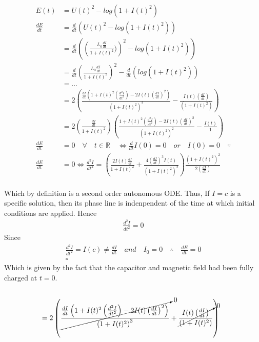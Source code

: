 \documentclass[a4paper]{article}
\begin{document}
\begin{equation*}
\begin{aligned}
\end{aligned}
\end{equation*}
\LARGE
\begin{align*}
E(t) & = U(t)^{2}-log(1+I(t)^{2})\\
\frac{dE}{dt} & = \frac{d}{dt}\left(U(t)^{2}-log(1+I(t)^{2})\right)\\
 & = \frac{d}{dt}\left(\left(\frac{L_{0}\frac{dI}{dt}}{1+I(t)^{2}})\right)^{2}-log\left(1+I(t)^{2}\right)\right) \\
& = \frac{d}{dt}\left(\frac{L_{0}\frac{dI}{dt}}{1+I(t)^{2}}\right)^{2}-\frac{d}{dt}\left(log\left(1+I(t)^{2}\right)\right)\\
& = ...\\
& = 2\left({\frac{\frac{dI}{dt}\left(1+I(t)^{2}\left(\frac{d^{2}I}{dt^{2}}\right)-2I(t)\left(\frac{dI}{dt}\right)^{2}\right)}{\left(1+I(t)^{2}\right)^{3}}} -   {\frac{I(t)\left(\frac{dI}{dt}\right)}{\left(1+I(t)^{2}\right)}}\right)\\
& = 2\left(\frac{\frac{dI}{dt}}{1+I(t)^{2}}\right)   \left({\frac{1+I(t)^{2}\left(\frac{d^{2}I}{dt^{2}}\right)-2I(t)\left(\frac{dI}{dt}\right)^{2}}{\left(1+I(t)^{2}\right)^{2}}} -   {\frac{I(t)}{1}}\right)\\
\frac{dE}{dt} & = 0 \quad \forall \quad t \in \mathbb{R} \quad \Longleftrightarrow \frac{d}{dt}I(0) = 0 \quad or \quad I(0)= 0 \quad \because \\
\frac{dE}{dt} &= 0 \Longleftrightarrow 
{\frac{d^{2}I}{dt^{2}}}=\left(\frac{2I(t)\frac{dI}{dt}}{1+I(t)^{2}}+\frac{4\left(\frac{dI}{dt}\right)^{3}I(t)}{\left(1+I(t)^{2}\right)^{3}}\right)\frac{\left(1+I(t)^{2}\right)^{2}}{2\left(\frac{dI}{dt}\right)}
\end{align*}\\
Which by definition is a second order autonomous ODE. Thus, If $I=c$ is a specific solution, then its phase line is indenpendent of the time at which initial conditions are applied. Hence
\begin{align*}
\frac{d^{2}I}{dt^{2}}=0
\end{align*}
Since 
\begin{align*}
\frac{d^{2}I}{dt^{2}}=I(c)\ne\frac{dI}{dt}\quad and\quad I_{0}=0 \quad \therefore\quad\frac{dE}{dt}=0\\
\square
\end{align*}
Which is given by the fact that the capacitor and magnetic field had been fully charged at $t=0$.

\begin{align*}
\end{align*}
\begin{align*}
& = 2\left(\cancelto{0}{\frac{\frac{dI}{dt}\left(1+I(t)^{2}\left(\frac{d^{2}I}{dt^{2}}\right)-2I(t)\left(\frac{dI}{dt}\right)^{2}\right)}{\left(1+I(t)^{2}\right)^{3}}} +   \cancelto{0}{\frac{I(t)\left(\frac{dI}{dt}\right)}{\left(1+I(t)^{2}\right)}}\right)
\end{align*}
\end{document}
